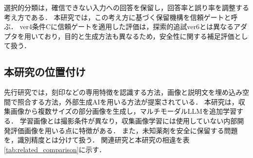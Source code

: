 \documentclass[uplatex,dvipdfmx]{jsarticle}
\begin{document}
選択的分類は，確信できない入力への回答を保留し，回答率と誤り率を調整する考え方である\cite{geifman2017selective}．
本研究では，この考え方に基づく保留機構を信頼ゲートと呼ぶ．
ver4条件Cに信頼ゲートを適用した評価は，探索的追試ver6とは異なるアダプタを用いており，目的と生成方法も異なるため，安全性に関する補足評価として扱う．

\subsection{本研究の位置付け}

先行研究では，刻印などの専用特徴を認識する方法，画像と説明文を埋め込み空間で照合する方法，外部生成AIを用いる方法が提案されている．
本研究は，収集画像から複数サイズの部分画像を生成し，マルチモーダルLLMを追加学習する．
学習画像とは撮影条件が異なり，収集画像学習には使用していない内部開発評価画像を用いる点に特徴がある．
また，未知薬剤を安全に保留する問題を，識別精度とは分けて扱う．
関連研究と本研究の相違を表\ref{tab:related_comparison}に示す．
\end{document}
